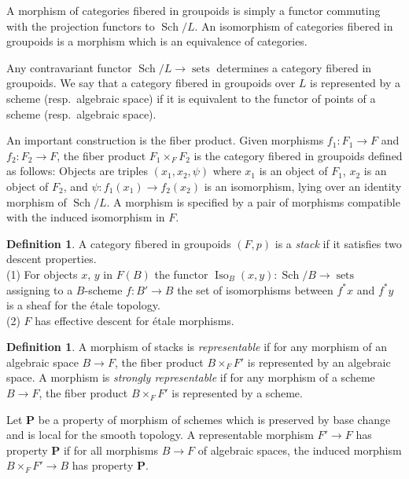 \documentclass[12pt]{amsart}
\newcommand{\BoldP}{{\mathbf P}}
\DeclareMathOperator{\Sch}{Sch}
\DeclareMathOperator{\Iso}{Iso}
\DeclareMathOperator{\sets}{sets}
\theoremstyle{plain}
\theoremstyle{definition}
\newtheorem  {defn} [thm] {Definition}
\theoremstyle{remark}
\begin{document}
A morphism of categories fibered in groupoids is simply 
a functor commuting with the projection functors
to $\Sch/L$. An isomorphism of categories fibered in groupoids
is a morphism which is an equivalence of categories.

Any contravariant functor $\Sch/L \rightarrow \sets$ determines
a category fibered in groupoids. We say that a category fibered in
groupoids over $L$ is represented
by a scheme (resp.\ algebraic space) if it is equivalent to
the functor of points of a scheme (resp.\ algebraic space).
 
An important construction is the fiber product.
Given morphisms $f_1\colon F_1 \rightarrow F$ and $f_2\colon F_2
\rightarrow F$, the fiber product $F_1 \times_F F_2$ is the category
fibered in groupoids defined as follows:
Objects are triples $(x_1, x_2, \psi)$ where
$x_1$ is an object of $F_1$, $x_2$ is an object of
$F_2$, and $\psi\colon f_1(x_1) \rightarrow f_2(x_2)$ is an isomorphism,
lying over an identity morphism of $\Sch/L$.
A morphism is specified by a pair of morphisms
compatible with the induced isomorphism in $F$.

\begin{defn}
A category fibered in groupoids $(F,p)$ is a {\it stack}
if it satisfies
two descent properties.\\
(1) For objects $x$, $y$ in $F(B)$ the functor
$\Iso_B(x,y)\colon \Sch/B \rightarrow \sets$ assigning
to a $B$-scheme $f\colon B' \rightarrow B$
the set of isomorphisms between $f^*x$ and $f^*y$ is a sheaf
for the \'etale topology.\\
(2) $F$ has effective descent
for \'etale morphisms.
\end{defn}

\begin{defn}
A morphism of stacks
is {\it representable} if for any morphism of an algebraic
space
$B \rightarrow F$, the fiber product $B \times_F F'$
is represented by an algebraic space. A morphism
is {\it strongly representable} if for any morphism
of a scheme $B \rightarrow F$, the fiber product
$B \times_F F'$ is represented by a scheme.
\end{defn}

Let $\BoldP$ be a property of morphism of schemes which is preserved
by base change  and is local for the smooth topology. A representable
morphism $F' \rightarrow F$ has property $\BoldP$ if for
all morphisms $B \rightarrow F$ of algebraic spaces, the induced
morphism $B \times_F F' \rightarrow B$ has property $\BoldP$.
\end{document}
